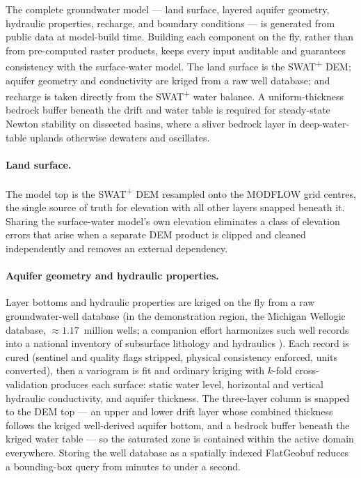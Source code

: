 The complete groundwater model --- land surface, layered aquifer geometry, hydraulic properties,
recharge, and boundary conditions --- is generated from public data at model-build time. Building
each component on the fly, rather than from pre-computed raster products, keeps every input auditable
and guarantees consistency with the surface-water model. The land surface is the SWAT\textsuperscript{+}
DEM; aquifer geometry and conductivity are kriged from a raw well database; and recharge is taken
directly from the SWAT\textsuperscript{+} water balance. A uniform-thickness bedrock buffer beneath
the drift and water table is required for steady-state Newton stability on dissected basins, where a
sliver bedrock layer in deep-water-table uplands otherwise dewaters and oscillates.

\paragraph{Land surface.} The model top is the SWAT\textsuperscript{+} DEM resampled onto the
MODFLOW grid centres, the single source of truth for elevation with all other layers snapped beneath
it. Sharing the surface-water model's own elevation eliminates a class of elevation errors that arise
when a separate DEM product is clipped and cleaned independently and removes an external dependency.

\paragraph{Aquifer geometry and hydraulic properties.} Layer bottoms and hydraulic properties are
kriged on the fly from a raw groundwater-well database (in the demonstration region, the Michigan
Wellogic database, $\approx 1.17$~million wells; a companion effort harmonizes such well records into a
national inventory of subsurface lithology and hydraulics \citep{rafiei2026gwinventory}). Each record is cured (sentinel and quality flags
stripped, physical consistency enforced, units converted), then a variogram is fit and ordinary
kriging with $k$-fold cross-validation produces each surface: static water level, horizontal and
vertical hydraulic conductivity, and aquifer thickness. The three-layer column is snapped to the DEM
top --- an upper and lower drift layer whose combined thickness follows the kriged well-derived
aquifer bottom, and a bedrock buffer beneath the kriged water table --- so the saturated zone is
contained within the active domain everywhere. Storing the well database as a spatially indexed
FlatGeobuf reduces a bounding-box query from minutes to under a second.

